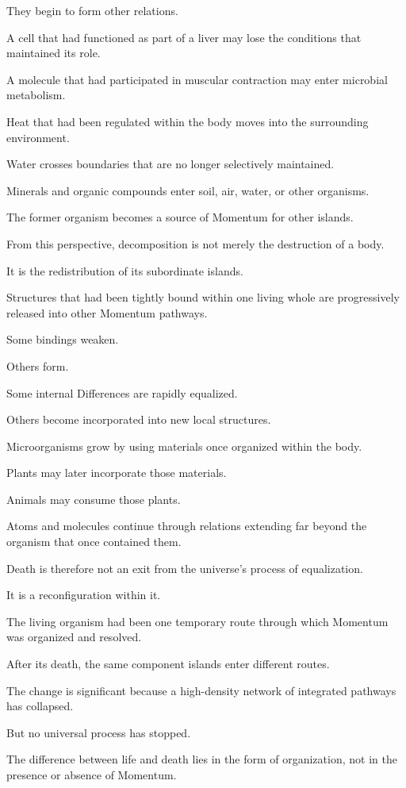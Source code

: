 They begin to form other relations.

A cell that had functioned as part of a liver may lose the conditions that maintained its role.

A molecule that had participated in muscular contraction may enter microbial metabolism.

Heat that had been regulated within the body moves into the surrounding environment.

Water crosses boundaries that are no longer selectively maintained.

Minerals and organic compounds enter soil, air, water, or other organisms.

The former organism becomes a source of Momentum for other islands.

From this perspective, decomposition is not merely the destruction of a body.

It is the redistribution of its subordinate islands.

Structures that had been tightly bound within one living whole are progressively released into other Momentum pathways.

Some bindings weaken.

Others form.

Some internal Differences are rapidly equalized.

Others become incorporated into new local structures.

Microorganisms grow by using materials once organized within the body.

Plants may later incorporate those materials.

Animals may consume those plants.

Atoms and molecules continue through relations extending far beyond the organism that once contained them.

Death is therefore not an exit from the universe’s process of equalization.

It is a reconfiguration within it.

The living organism had been one temporary route through which Momentum was organized and resolved.

After its death, the same component islands enter different routes.

The change is significant because a high-density network of integrated pathways has collapsed.

But no universal process has stopped.

The difference between life and death lies in the form of organization, not in the presence or absence of Momentum.


